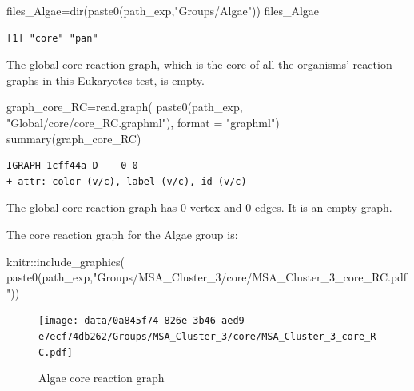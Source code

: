 \documentclass[
  letterpaper,
  DIV=11,
  numbers=noendperiod]{scrreprt}
\newenvironment{Shaded}{}{}
\newcommand{\AttributeTok}[1]{\textcolor[rgb]{0.78,0.47,0.87}{#1}}
\newcommand{\FunctionTok}[1]{\textcolor[rgb]{0.38,0.69,0.94}{#1}}
\newcommand{\NormalTok}[1]{\textcolor[rgb]{0.67,0.70,0.75}{#1}}
\newcommand{\OtherTok}[1]{\textcolor[rgb]{0.15,0.68,0.38}{#1}}
\newcommand{\SpecialCharTok}[1]{\textcolor[rgb]{0.34,0.71,0.76}{#1}}
\newcommand{\StringTok}[1]{\textcolor[rgb]{0.60,0.76,0.47}{#1}}
\begin{document}
\begin{Shaded}
\begin{Highlighting}[]
\NormalTok{files\_Algae}\OtherTok{=}\FunctionTok{dir}\NormalTok{(}\FunctionTok{paste0}\NormalTok{(path\_exp,}\StringTok{"Groups/Algae"}\NormalTok{))}
\NormalTok{files\_Algae}
\end{Highlighting}
\end{Shaded}

\begin{verbatim}
[1] "core" "pan" 
\end{verbatim}

The global core reaction graph, which is the core of all the organisms'
reaction graphs in this Eukaryotes test, is empty.

\begin{Shaded}
\begin{Highlighting}[]
\NormalTok{graph\_core\_RC}\OtherTok{=}\FunctionTok{read.graph}\NormalTok{(}
  \FunctionTok{paste0}\NormalTok{(path\_exp,}
         \StringTok{"Global/core/core\_RC.graphml"}\NormalTok{),}
  \AttributeTok{format =} \StringTok{"graphml"}\NormalTok{)}
\FunctionTok{summary}\NormalTok{(graph\_core\_RC)}
\end{Highlighting}
\end{Shaded}

\begin{verbatim}
IGRAPH 1cff44a D--- 0 0 -- 
+ attr: color (v/c), label (v/c), id (v/c)
\end{verbatim}

The global core reaction graph has 0 vertex and 0 edges. It is an empty
graph.

The core reaction graph for the Algae group is:

\begin{Shaded}
\begin{Highlighting}[]
\NormalTok{knitr}\SpecialCharTok{::}\FunctionTok{include\_graphics}\NormalTok{(}
  \FunctionTok{paste0}\NormalTok{(path\_exp,}\StringTok{"Groups/MSA\_Cluster\_3/core/MSA\_Cluster\_3\_core\_RC.pdf"}\NormalTok{))}
\end{Highlighting}
\end{Shaded}

\begin{figure}[H]

{\centering \texttt{[image: data/0a845f74-826e-3b46-aed9-e7ecf74db262/Groups/MSA\_Cluster\_3/core/MSA\_Cluster\_3\_core\_RC.pdf]}

}

\caption{Algae core reaction graph}

\end{figure}%
\end{document}
